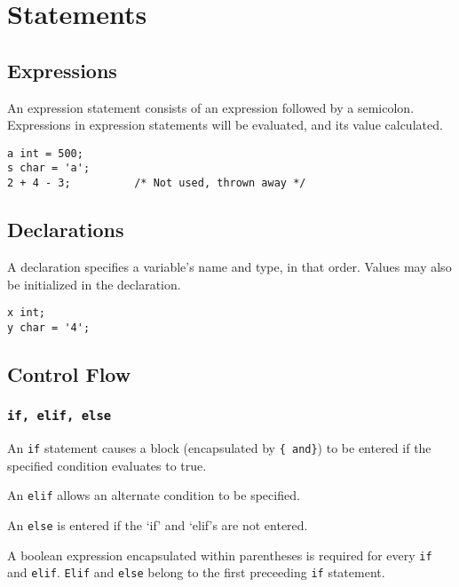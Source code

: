 \chapter{Statements}

    \section{Expressions}
        An expression statement consists of an expression followed by a semicolon. Expressions in expression statements will be evaluated, and its value calculated.

        \begin{lstlisting}
a int = 500;
s char = 'a';
2 + 4 - 3;          /* Not used, thrown away */
        \end{lstlisting}


    \section{Declarations}
        A declaration specifies a variable's name and type, in that order. Values may also be initialized in the declaration.

        \begin{lstlisting}
x int;
y char = '4';
        \end{lstlisting}

    \section{Control Flow}

        \subsection{\texttt{if, elif, else}}
            An \texttt{if} statement causes a block (encapsulated by \texttt{\{ and\}}) to be entered if the specified condition evaluates to true.

            \vspace{5mm}
            \noindent An \texttt{elif} allows an alternate condition to be specified.
            
            \vspace{5mm}
            \noindent An \texttt{else} is entered if the `if' and `elif's are not entered. 
           
           \vspace{5mm}
            \noindent A boolean expression encapsulated within parentheses is required for every \texttt{if} and \texttt{elif}. \texttt{Elif} and \texttt{else} belong to the first preceeding \texttt{if} statement. 


